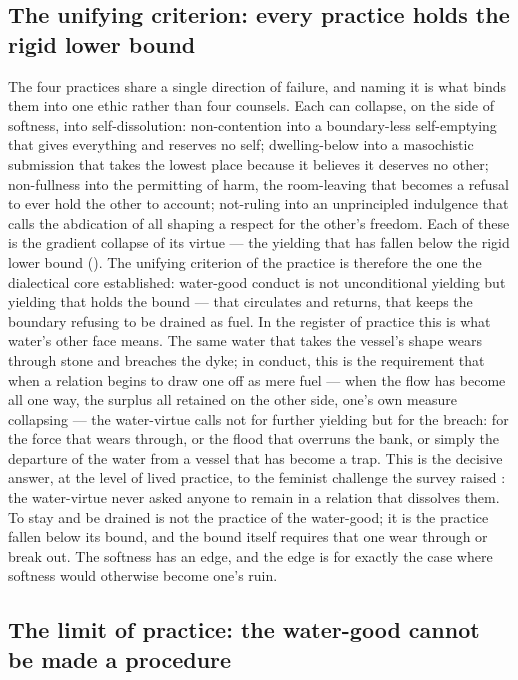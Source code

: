 \subsection{The unifying criterion: every practice holds the rigid lower bound}
\label{p20:sub:practice-bound}

The four practices share a single direction of failure, and naming it is what binds them into one ethic rather than four counsels. Each can collapse, on the side of softness, into self-dissolution: non-contention into a boundary-less self-emptying that gives everything and reserves no self; dwelling-below into a masochistic submission that takes the lowest place because it believes it deserves no other; non-fullness into the permitting of harm, the room-leaving that becomes a refusal to ever hold the other to account; not-ruling into an unprincipled indulgence that calls the abdication of all shaping a respect for the other's freedom. Each of these is the gradient collapse of its virtue --- the yielding that has fallen below the rigid lower bound (). The unifying criterion of the practice is therefore the one the dialectical core established: water-good conduct is not unconditional yielding but yielding that holds the bound --- that circulates and returns, that keeps the boundary refusing to be drained as fuel. In the register of practice this is what water's other face means. The same water that takes the vessel's shape wears through stone and breaches the dyke; in conduct, this is the requirement that when a relation begins to draw one off as mere fuel --- when the flow has become all one way, the surplus all retained on the other side, one's own measure collapsing --- the water-virtue calls not for further yielding but for the breach: for the force that wears through, or the flood that overruns the bank, or simply the departure of the water from a vessel that has become a trap. This is the decisive answer, at the level of lived practice, to the feminist challenge the survey raised \parencite{wan2024grb}: the water-virtue never asked anyone to remain in a relation that dissolves them. To stay and be drained is not the practice of the water-good; it is the practice fallen below its bound, and the bound itself requires that one wear through or break out. The softness has an edge, and the edge is for exactly the case where softness would otherwise become one's ruin.

\subsection{The limit of practice: the water-good cannot be made a procedure}
\label{p20:sub:practice-limit}

